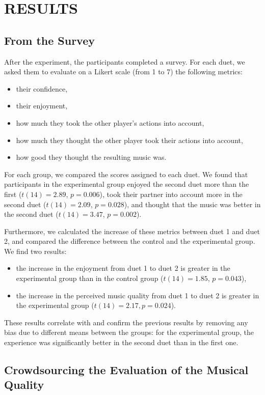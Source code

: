 \documentclass{article}
\begin{document}
\section{RESULTS}

\subsection{From the Survey}

After the experiment, the participants completed a survey. For each duet, we asked them to evaluate on a Likert scale (from 1 to 7) the following metrics:
\begin{itemize}
\item their confidence,
\item their enjoyment,
\item how much they took the other player's actions into account,
\item how much they thought the other player took their actions into account,
\item how good they thought the resulting music was.
\end{itemize}
For each group, we compared the scores assigned to each duet. We found that participants in the experimental group enjoyed the second duet more than the first ($t(14) = 2.89$, $p = 0.006$), took their partner into account more in the second duet ($t(14) = 2.09$, $p = 0.028$), and thought that the music was better in the second duet ($t(14) = 3.47$, $p = 0.002$).

Furthermore, we calculated the increase of these metrics between duet 1 and duet 2, and compared the difference between the control and the experimental group. We find two results:
\begin{itemize}
\item the increase in the enjoyment from duet 1 to duet 2 is greater in the experimental group than in the control group ($t(14) = 1.85$, $p = 0.043$),
\item the increase in the perceived music quality from duet 1 to duet 2 is greater in the experimental group ($t(14) = 2.17, p = 0.024$).
\end{itemize}
These results correlate with and confirm the previous results by removing any bias due to different means between the groups: for the experimental group, the experience was significantly better in the second duet than in the first one.


\subsection{Crowdsourcing the Evaluation of the Musical Quality}
\end{document}
